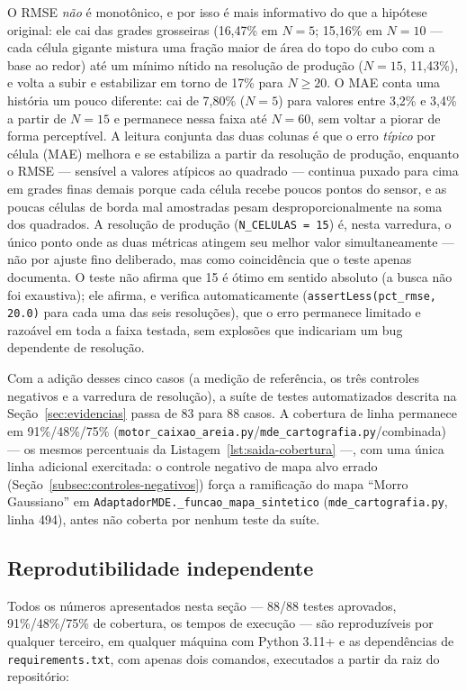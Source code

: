 O RMSE \emph{não} é monotônico, e por isso é mais informativo do que a
hipótese original: ele cai das grades grosseiras (16,47\% em $N=5$;
15,16\% em $N=10$ — cada célula gigante mistura uma fração maior de
área do topo do cubo com a base ao redor) até um mínimo nítido na
resolução de produção ($N=15$, 11,43\%), e volta a subir e estabilizar
em torno de 17\% para $N \geq 20$. O MAE conta uma história um pouco
diferente: cai de 7,80\% ($N=5$) para valores entre 3,2\% e 3,4\% a
partir de $N=15$ e permanece nessa faixa até $N=60$, sem voltar a
piorar de forma perceptível. A leitura conjunta das duas colunas é que
o erro \emph{típico} por célula (MAE) melhora e se estabiliza a partir
da resolução de produção, enquanto o RMSE — sensível a valores
atípicos ao quadrado — continua puxado para cima em grades finas
demais porque cada célula recebe poucos pontos do sensor, e as poucas
células de borda mal amostradas pesam desproporcionalmente na soma dos
quadrados. A resolução de produção (\texttt{N\_CELULAS = 15}) é, nesta
varredura, o único ponto onde as duas métricas atingem seu melhor
valor simultaneamente — não por ajuste fino deliberado, mas como
coincidência que o teste apenas documenta. O teste não afirma que 15 é
ótimo em sentido absoluto (a busca não foi exaustiva); ele afirma, e
verifica automaticamente (\texttt{assertLess(pct\_rmse, 20.0)} para
cada uma das seis resoluções), que o erro permanece limitado e
razoável em toda a faixa testada, sem explosões que indicariam um bug
dependente de resolução.

Com a adição desses cinco casos (a medição de referência, os três
controles negativos e a varredura de resolução), a suíte de testes
automatizados descrita na Seção~\ref{sec:evidencias} passa de 83 para
88 casos. A cobertura de linha permanece em 91\%/48\%/75\%
(\texttt{motor\_caixao\_areia.py}/\texttt{mde\_cartografia.py}/combinada)
— os mesmos percentuais da Listagem~\ref{lst:saida-cobertura} —, com
uma única linha adicional exercitada: o controle negativo de mapa alvo
errado (Seção~\ref{subsec:controles-negativos}) força a ramificação do
mapa ``Morro Gaussiano'' em \texttt{AdaptadorMDE.\_funcao\_mapa\_sintetico}
(\texttt{mde\_cartografia.py}, linha 494), antes não coberta por
nenhum teste da suíte.

\subsection{Reprodutibilidade independente}
\label{subsec:reprodutibilidade}

Todos os números apresentados nesta seção — 88/88 testes aprovados,
91\%/48\%/75\% de cobertura, os tempos de execução — são
reproduzíveis por qualquer terceiro, em qualquer máquina com Python
3.11+ e as dependências de \texttt{requirements.txt}, com apenas dois
comandos, executados a partir da raiz do repositório:

